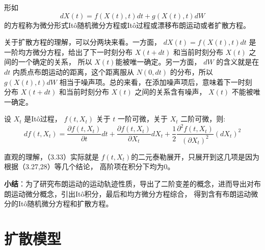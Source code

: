 \documentclass[lang=cn,newtx,10pt,scheme=chinese]{elegantbook}
\begin{document}
\begin{definition}[扩散方程]
  形如
  \begin{equation}
    d X(t)=f(X(t), t) d t+g(X(t), t) d W
  \end{equation}
  的方程称为微分形式Itô随机微分方程或Itô过程或漂移布朗运动或者扩散方程。
\end{definition}
关于扩散方程的理解，可以分两块来看。一方面， $d X(t)=f(X(t), t) d t$ 
是一阶均方微分方程，给出了下一时刻分布 $X(t+d t)$ 和当前时刻分布 $X(t)$ 之间的一个确定的关系，
所以 $X(t)$能被唯一确定。另一方面， $d W$ 的含义就是在 $d t$ 内质点布朗运动的距离，这个距离服从 
$N(0, d t)$ 的分布，所以 $g(X(t), t) d W$ 相当于噪声项。总的来看，在添加噪声项后，意味着下一时刻
分布 $X(t+d t)$ 和当前时刻分布 $X(t)$ 之间的关系含有噪声， $X(t)$ 不能被唯一确定。

\begin{lemma}[Itô引理]
  设 $X_t$ 是Itô过程， $f\left(t, X_t\right)$ 关于 $t$ 一阶可微，关于 $X_t$ 二阶可微，则:
\begin{equation}
  d f\left(t, X_t\right)=\frac{\partial f\left(t, X_t\right)}{\partial t} d t+\frac{\partial f\left(t, X_t\right)}{\partial X_t} d X_t+\frac{1}{2} \frac{\partial^2 f\left(t, X_t\right)}{\left(\partial X_t\right)^2}\left(d X_t\right)^2
\end{equation}
\end{lemma}
直观的理解，（3.33）实际就是 $f(t, X_t)$的二元泰勒展开，只展开到这几项是因为根据（3.27,28）等几个结论，
高阶项在积分下均为0。

\textbf{小结}：为了研究布朗运动的运动轨迹性质，导出了二阶变差的概念，进而导出对布朗运动微分概念，引出Itô积分，最后和均方微分方程综合，
得到含有布朗运动微分的Itô随机微分方程和扩散方程。





\chapter{扩散模型}
\end{document}
